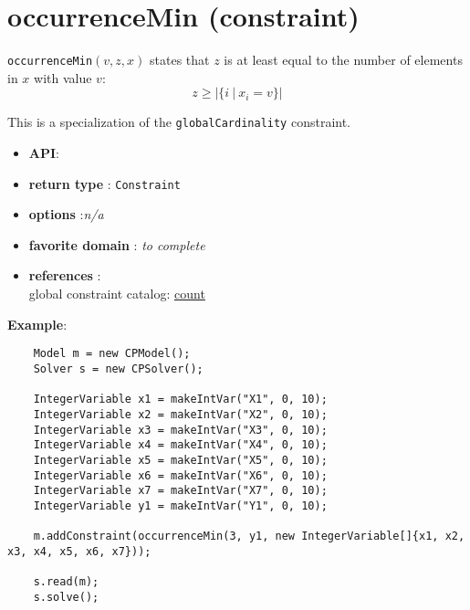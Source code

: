 \label{occurrencemin}
\hypertarget{occurrencemin}{}

\section{occurrenceMin (constraint)}\label{occurrencemin:occurrenceminconstraint}\hypertarget{occurrencemin:occurrenceminconstraint}{}
\begin{notedef}
  \texttt{occurrenceMin}$(v,z,x)$ states that $z$ is at least equal to the number of elements in $x$ with value $v$:
$$z\ge|\{i\ |\ x_i=v\}|$$   
\end{notedef}
  This is a specialization of the \texttt{globalCardinality} constraint.

\begin{itemize}
	\item \textbf{API}: 
	\item \textbf{return type} : \texttt{Constraint}
	\item \textbf{options} :\emph{n/a}
	\item \textbf{favorite domain} : \emph{to complete}
	\item \textbf{references} :\\
      global constraint catalog: \href{http://www.emn.fr/x-info/sdemasse/gccat/Ccount.html}{count}
\end{itemize}

\textbf{Example}:
\begin{lstlisting}
	Model m = new CPModel();
	Solver s = new CPSolver();
	 
	IntegerVariable x1 = makeIntVar("X1", 0, 10);
	IntegerVariable x2 = makeIntVar("X2", 0, 10);
	IntegerVariable x3 = makeIntVar("X3", 0, 10);
	IntegerVariable x4 = makeIntVar("X4", 0, 10);
	IntegerVariable x5 = makeIntVar("X5", 0, 10);
	IntegerVariable x6 = makeIntVar("X6", 0, 10);
	IntegerVariable x7 = makeIntVar("X7", 0, 10);
	IntegerVariable y1 = makeIntVar("Y1", 0, 10);
	 
	m.addConstraint(occurrenceMin(3, y1, new IntegerVariable[]{x1, x2, x3, x4, x5, x6, x7}));
	 
	s.read(m);
	s.solve();
\end{lstlisting} 
